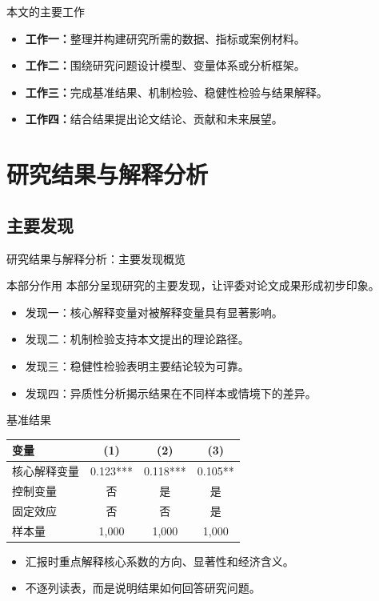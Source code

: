 \documentclass{beamer}
\begin{document}
\begin{frame}{本文的主要工作}
    \begin{itemize}
        \item \textbf{工作一：}整理并构建研究所需的数据、指标或案例材料。
        \item \textbf{工作二：}围绕研究问题设计模型、变量体系或分析框架。
        \item \textbf{工作三：}完成基准结果、机制检验、稳健性检验与结果解释。
        \item \textbf{工作四：}结合结果提出论文结论、贡献和未来展望。
    \end{itemize}
\end{frame}

\section{研究结果与解释分析}

\subsection{主要发现}

\begin{frame}{研究结果与解释分析：主要发现概览}
    \begin{block}{本部分作用}
        本部分呈现研究的主要发现，让评委对论文成果形成初步印象。
    \end{block}
    \begin{itemize}
        \item 发现一：核心解释变量对被解释变量具有显著影响。
        \item 发现二：机制检验支持本文提出的理论路径。
        \item 发现三：稳健性检验表明主要结论较为可靠。
        \item 发现四：异质性分析揭示结果在不同样本或情境下的差异。
    \end{itemize}
\end{frame}

\begin{frame}{基准结果}
    \begin{table}[h]
        \centering
        \small
        \begin{tabular}{lccc}
            \toprule
            变量 & (1) & (2) & (3) \\
            \midrule
            核心解释变量 & 0.123*** & 0.118*** & 0.105** \\
            控制变量 & 否 & 是 & 是 \\
            固定效应 & 否 & 否 & 是 \\
            样本量 & 1,000 & 1,000 & 1,000 \\
            \bottomrule
        \end{tabular}
    \end{table}
    \begin{itemize}
        \item 汇报时重点解释核心系数的方向、显著性和经济含义。
        \item 不逐列读表，而是说明结果如何回答研究问题。
    \end{itemize}
\end{frame}
\end{document}
